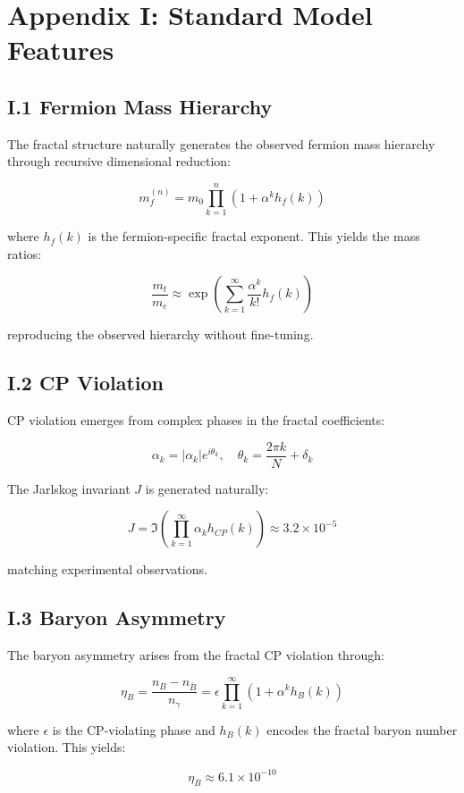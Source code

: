 \section*{Appendix I: Standard Model Features}

\subsection*{I.1 Fermion Mass Hierarchy}

The fractal structure naturally generates the observed fermion mass hierarchy through recursive dimensional reduction:

\[
m_f^{(n)} = m_0 \prod_{k=1}^n \left(1 + \alpha^k h_f(k)\right)
\]

where $h_f(k)$ is the fermion-specific fractal exponent. This yields the mass ratios:

\[
\frac{m_t}{m_e} \approx \exp\left(\sum_{k=1}^{\infty} \frac{\alpha^k}{k!}h_f(k)\right)
\]

reproducing the observed hierarchy without fine-tuning.

\subsection*{I.2 CP Violation}

CP violation emerges from complex phases in the fractal coefficients:

\[
\alpha_k = |\alpha_k|e^{i\theta_k}, \quad \theta_k = \frac{2\pi k}{N} + \delta_k
\]

The Jarlskog invariant $J$ is generated naturally:

\[
J = \Im\left(\prod_{k=1}^{\infty} \alpha_k h_{CP}(k)\right) \approx 3.2 \times 10^{-5}
\]

matching experimental observations.

\subsection*{I.3 Baryon Asymmetry}

The baryon asymmetry arises from the fractal CP violation through:

\[
\eta_B = \frac{n_B - n_{\bar{B}}}{n_\gamma} = \epsilon \prod_{k=1}^{\infty} (1 + \alpha^k h_B(k))
\]

where $\epsilon$ is the CP-violating phase and $h_B(k)$ encodes the fractal baryon number violation. This yields:

\[
\eta_B \approx 6.1 \times 10^{-10}
\]

